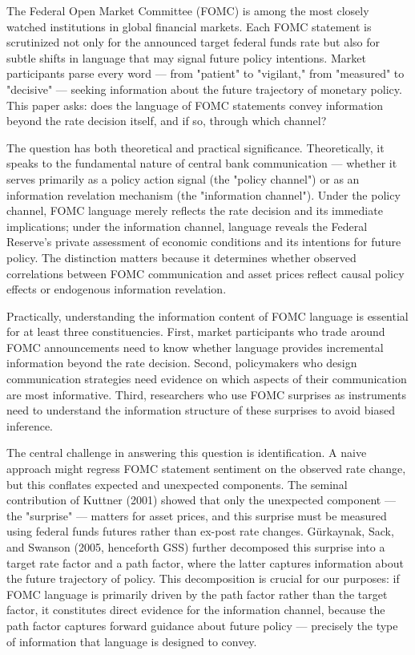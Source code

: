 The Federal Open Market Committee (FOMC) is among the most closely watched institutions in global financial markets. Each FOMC statement is scrutinized not only for the announced target federal funds rate but also for subtle shifts in language that may signal future policy intentions. Market participants parse every word --- from "patient" to "vigilant," from "measured" to "decisive" --- seeking information about the future trajectory of monetary policy. This paper asks: does the language of FOMC statements convey information beyond the rate decision itself, and if so, through which channel?

The question has both theoretical and practical significance. Theoretically, it speaks to the fundamental nature of central bank communication --- whether it serves primarily as a policy action signal (the "policy channel") or as an information revelation mechanism (the "information channel"). Under the policy channel, FOMC language merely reflects the rate decision and its immediate implications; under the information channel, language reveals the Federal Reserve's private assessment of economic conditions and its intentions for future policy. The distinction matters because it determines whether observed correlations between FOMC communication and asset prices reflect causal policy effects or endogenous information revelation.

Practically, understanding the information content of FOMC language is essential for at least three constituencies. First, market participants who trade around FOMC announcements need to know whether language provides incremental information beyond the rate decision. Second, policymakers who design communication strategies need evidence on which aspects of their communication are most informative. Third, researchers who use FOMC surprises as instruments need to understand the information structure of these surprises to avoid biased inference.

The central challenge in answering this question is identification. A naive approach might regress FOMC statement sentiment on the observed rate change, but this conflates expected and unexpected components. The seminal contribution of Kuttner (2001) showed that only the unexpected component --- the "surprise" --- matters for asset prices, and this surprise must be measured using federal funds futures rather than ex-post rate changes. G\"urkaynak, Sack, and Swanson (2005, henceforth GSS) further decomposed this surprise into a target rate factor and a path factor, where the latter captures information about the future trajectory of policy. This decomposition is crucial for our purposes: if FOMC language is primarily driven by the path factor rather than the target factor, it constitutes direct evidence for the information channel, because the path factor captures forward guidance about future policy --- precisely the type of information that language is designed to convey.

